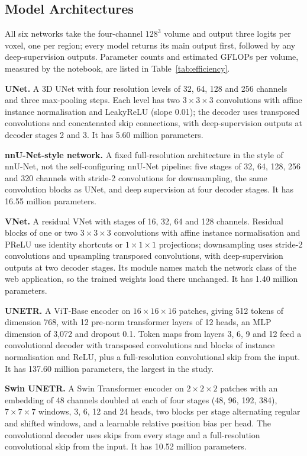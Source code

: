 \documentclass[final,3p,times,number]{elsarticle}
\begin{document}
\subsection{Model Architectures}

All six networks take the four-channel $128^3$ volume and output three logits per voxel, one per region; every model returns its main output first, followed by any deep-supervision outputs. Parameter counts and estimated GFLOPs per volume, measured by the notebook, are listed in Table~\ref{tab:efficiency}.

\textbf{UNet.} A 3D UNet with four resolution levels of 32, 64, 128 and 256 channels and three max-pooling steps. Each level has two $3\times 3\times 3$ convolutions with affine instance normalisation and LeakyReLU (slope 0.01); the decoder uses transposed convolutions and concatenated skip connections, with deep-supervision outputs at decoder stages 2 and 3. It has 5.60 million parameters.

\textbf{nnU-Net-style network.} A fixed full-resolution architecture in the style of nnU-Net, not the self-configuring nnU-Net pipeline: five stages of 32, 64, 128, 256 and 320 channels with stride-2 convolutions for downsampling, the same convolution blocks as UNet, and deep supervision at four decoder stages. It has 16.55 million parameters.

\textbf{VNet.} A residual VNet with stages of 16, 32, 64 and 128 channels. Residual blocks of one or two $3\times 3\times 3$ convolutions with affine instance normalisation and PReLU use identity shortcuts or $1\times 1\times 1$ projections; downsampling uses stride-2 convolutions and upsampling transposed convolutions, with deep-supervision outputs at two decoder stages. Its module names match the network class of the web application, so the trained weights load there unchanged. It has 1.40 million parameters.

\textbf{UNETR.} A ViT-Base encoder on $16\times 16\times 16$ patches, giving 512 tokens of dimension 768, with 12 pre-norm transformer layers of 12 heads, an MLP dimension of 3,072 and dropout 0.1. Token maps from layers 3, 6, 9 and 12 feed a convolutional decoder with transposed convolutions and blocks of instance normalisation and ReLU, plus a full-resolution convolutional skip from the input. It has 137.60 million parameters, the largest in the study.

\textbf{Swin UNETR.} A Swin Transformer encoder on $2\times 2\times 2$ patches with an embedding of 48 channels doubled at each of four stages (48, 96, 192, 384), $7\times 7\times 7$ windows, 3, 6, 12 and 24 heads, two blocks per stage alternating regular and shifted windows, and a learnable relative position bias per head. The convolutional decoder uses skips from every stage and a full-resolution convolutional skip from the input. It has 10.52 million parameters.
\end{document}

